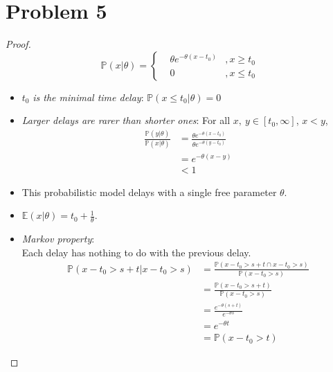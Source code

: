 \documentclass{article}
\begin{document}
\section*{Problem 5}
    \begin{proof}
        \begin{equation*}
            \mathbb{P}(x|\theta)=\left\{
                \begin{array}{rcl}
                &\theta e^{-\theta(x-t_0)} & ,{x \geqslant t_0}\\
                &0 & ,{x \leqslant t_0}
                \end{array} \right.
        \end{equation*}
        \begin{itemize}
            \item $t_0$ \textit{is the minimal time delay}:
                    $\mathbb{P}(x\leqslant t_0|\theta) = 0$
            \item \textit{Larger delays are rarer than shorter ones}:
                    For all $x,\ y\in [t_0,\infty]$, $x<y$,
                    \begin{align*}
                        \frac{\mathbb{P}(y|\theta)}{\mathbb{P}(x|\theta)}
                        &=\frac{\theta e^{-\theta(x-t_0)}}{\theta e^{-\theta(y-t_0)}}\\
                        &=e^{-\theta(x-y)}\\
                        &<1
                    \end{align*}
            \item This probabilistic model delays with a single free parameter $\theta$.
            \item $\mathbb{E}(x|\theta) = t_0+\frac{1}{\theta}$.\
            \item \textit{Markov property}:\\
            Each delay has nothing to do with the previous delay.
            \begin{align*}
                \mathbb{P}(x-t_0>s+t|x-t_0>s)
                &=\frac{\mathbb{P}(x-t_0>s+t \cap x-t_0>s)}{\mathbb{P}(x-t_0>s)}\\
                &=\frac{\mathbb{P}(x-t_0>s+t)}{\mathbb{P}(x-t_0>s)}\\
                &=\frac{e^{-\theta(s+t)}}{e^{-\theta s}}\\
                &=e^{-\theta t}\\
                &=\mathbb{P}(x-t_0>t)
            \end{align*}
        \end{itemize}
    \end{proof}
\end{document}
